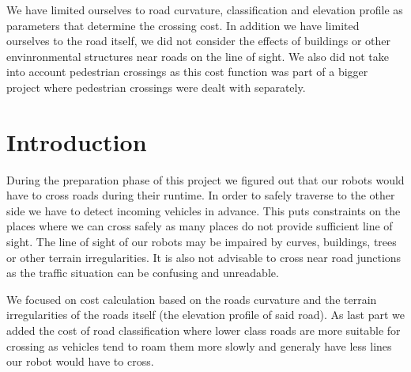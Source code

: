 \documentclass[oneside]{article}
\begin{document}
    We have limited ourselves to road curvature, classification and elevation profile as parameters that determine the crossing cost. In addition we have limited ourselves to the road itself, we did not consider the effects of buildings or other envinronmental structures near roads on the line of sight. We also did not take into account pedestrian crossings as this cost function was part of a bigger project where pedestrian crossings were dealt with separately.

    \section{Introduction}
    During the preparation phase of this project we figured out that our robots would have to cross roads during their runtime. In order to safely traverse to the other side we have to detect incoming vehicles in advance. This puts constraints on the places where we can cross safely as many places do not provide sufficient line of sight. The line of sight of our robots may be impaired by curves, buildings, trees or other terrain irregularities. It is also not advisable to cross near road junctions as the traffic situation can be confusing and unreadable.

    We focused on cost calculation based on the roads curvature and the terrain irregularities of the roads itself (the elevation profile of said road). As last part we added the cost of road classification where lower class roads are more suitable for crossing as vehicles tend to roam them more slowly and generaly have less lines our robot would have to cross.
\end{document}

